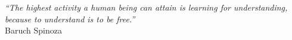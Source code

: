 \newpage
\thispagestyle{empty} %
\vspace*{\fill} %
\begin{center} %
	\textit{``The highest activity a human being can attain is learning for understanding, because to understand is to be free.''}\\
	\vspace{10pt} %
	Baruch Spinoza
\end{center}
\vspace*{\fill} %